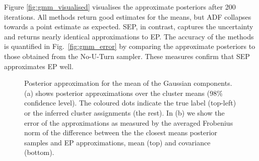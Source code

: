 
Figure \ref{fig:gmm_visualised} visualises the approximate posteriors after 200 iterations. All methods return good estimates for the means, but ADF collapses towards a point estimate as expected. SEP, in contrast, captures the uncertainty and returns nearly identical approximations to EP. The accuracy of the methods is quantified in Fig.~\ref{fig:gmm_error} by comparing the approximate posteriors to those obtained from the No-U-Turn sampler. These measures confirm that SEP approximates EP well.

\begin{figure}
\centering
\caption{Posterior approximation for the mean of the Gaussian components. (a) shows posterior approximations over the cluster means (98\% confidence level). The coloured dots indicate the true label (top-left) or the inferred cluster assignments (the rest). In (b) we show the error of the approximations as measured by the averaged Frobenius norm of the difference between the the closest means posterior samples and EP approximations, mean (top) and covariance (bottom).}
\end{figure}
